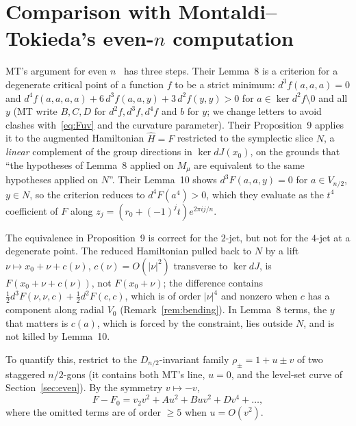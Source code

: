 \documentclass[11pt]{article}
\numberwithin{equation}{section}
\theoremstyle{definition}
\theoremstyle{remark}
\begin{document}
\section{Comparison with Montaldi--Tokieda's even-\texorpdfstring{$n$}{n} computation}\label{sec:mt}

MT's argument for even $n$~\cite[\S3.5, pp.~19--21]{MT} has three steps. Their Lemma~8 is a criterion for a
degenerate critical point of a function $f$ to be a strict minimum: $d^3f(a,a,a)=0$ and
$d^4f(a,a,a,a)+6\,d^3f(a,a,y)+3\,d^2f(y,y)>0$ for $a\in\ker d^2f\setminus0$ and all $y$ (MT write $B,C,D$
for $d^2f,d^3f,d^4f$ and $b$ for $y$; we change letters to avoid clashes with~\eqref{eq:Fuv} and the
curvature parameter). Their Proposition~9 applies it to the augmented Hamiltonian $\hat H=F$ restricted to
the symplectic slice $N$, a \emph{linear} complement of the group directions in $\ker dJ(x_0)$, on the
grounds that ``the hypotheses of Lemma~8 applied on $M_\mu$ are equivalent to the same hypotheses applied on
$N$''. Their Lemma~10 shows $d^3F(a,a,y)=0$ for $a\in V_{n/2}$, $y\in N$, so the criterion reduces to $d^4F(a^4)>0$,
which they evaluate as the $t^4$ coefficient of $F$ along $z_j=(r_0+(-1)^jt)e^{2\pi ij/n}$.

The equivalence in Proposition~9 is correct for the $2$-jet, but not for the $4$-jet at a degenerate point.
The reduced Hamiltonian pulled back to $N$ by a lift $\nu\mapsto x_0+\nu+c(\nu)$, $c(\nu)=O(|\nu|^2)$
transverse to $\ker dJ$, is $F(x_0+\nu+c(\nu))$, not $F(x_0+\nu)$; the difference contains
$\tfrac12d^3F(\nu,\nu,c)+\tfrac12d^2F(c,c)$, which is of order $|\nu|^4$ and nonzero when $c$ has a component
along radial $V_0$ (Remark~\ref{rem:bending}). In Lemma~8 terms, the $y$ that matters is $c(a)$, which is
forced by the constraint, lies outside $N$, and is not killed by Lemma~10.

To quantify this, restrict to the $D_{n/2}$-invariant family $\rho_\pm=1+u\pm v$ of two staggered
$n/2$-gons (it contains both MT's line, $u=0$, and the level-set curve of Section~\ref{sec:even}). By the
symmetry $v\mapsto-v$,
\begin{equation}\label{eq:Fuv}
F-F_0=v_2v^2+Au^2+Buv^2+Dv^4+\dots,
\end{equation}
where the omitted terms are of order $\ge5$ when $u=O(v^2)$.
\end{document}
